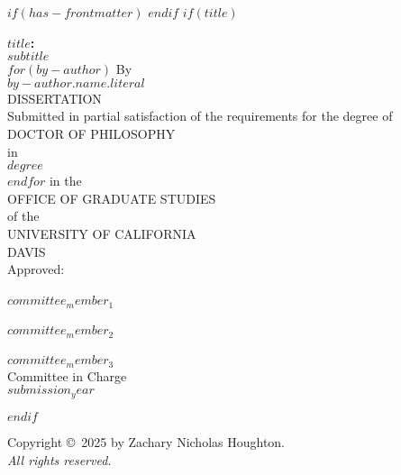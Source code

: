 $if(has-frontmatter)$
\frontmatter
$endif$
$if(title)$
\cleardoublepage
\thispagestyle{plain}
\begin{center}
   \null\vfill
   \textbf{%
      $title$:\\
	  $subtitle$
   }%
   \\
$for(by-author)$
   \bigskip
   By \\
   \bigskip
   {$by-author.name.literal$}
\\   
   DISSERTATION \\
   \bigskip
   Submitted in partial satisfaction of the requirements for the
   degree of \\
   \bigskip
   DOCTOR OF PHILOSOPHY \\
   \bigskip
   in \\
   \bigskip
   {$degree$} \\ 
   $endfor$
   \bigskip
   in the \\
   \bigskip
   OFFICE OF GRADUATE STUDIES \\
   \bigskip        
   of the \\
   \bigskip
   UNIVERSITY OF CALIFORNIA \\
   \bigskip
   DAVIS \\
   \bigskip
   Approved: \\
   \bigskip
   \bigskip
   \makebox[3in]{\hrulefill} \\
   $committee_member_1$ \\
   \bigskip
   \bigskip
   \makebox[3in]{\hrulefill} \\
   $committee_member_2$ \\
   \bigskip
   \bigskip
   \makebox[3in]{\hrulefill} \\
   $committee_member_3$ \\
   \bigskip
   Committee in Charge \\
   \bigskip
   $submission_year$ \\
   \vfill
\end{center}
$endif$


\newpage
{}
\setcounter{savedpage}{\value{page}}

\thispagestyle{empty}
\begin{titlepage}
\begin{center}
  Copyright \copyright\ 2025 by Zachary Nicholas Houghton. \\
  \textit{All rights reserved.}
\end{center}
\end{titlepage}

\setcounter{page}{\value{savedpage}} %
\clearpage
